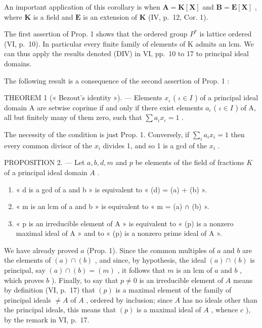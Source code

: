 An important application of this corollary is when \(\mathbf{A} = \mathbf{K}[\mathbf{X}]\) and \(\mathbf{B} = \mathbf{E}[\mathbf{X}]\) , where \(\mathbf{K}\) is a field and \(\mathbf{E}\) is an extension of \(\mathbf{K}\) (IV, p.~12, Cor. 1).

The first assertion of Prop. 1 shows that the ordered group \(P^{*}\) is lattice ordered (VI, p.~10). In particular every finite family of elements of K admits an lcm. We can thus apply the results denoted (DIV) in VI, pp.~10 to 17 to principal ideal domains.

The following result is a consequence of the second assertion of Prop. 1 :

THEOREM 1 (« Bezout's identity »). --- Elements \(x_{\iota}\) ( \(\iota \in I\) ) of a principal ideal domain A are setwise coprime if and only if there exist elements \(a_{\iota}\) ( \(\iota \in I\) ) of A, all but finitely many of them zero, such that \(\sum a_{\iota}x_{\iota} = 1\) .

The necessity of the condition is just Prop. 1. Conversely, if \(\sum_{i} a_i x_i = 1\) then every common divisor of the \(x_i\) divides 1, and so 1 is a gcd of the \(x_i\) .

PROPOSITION 2. --- Let \(a, b, d, m\) and \(p\) be elements of the field of fractions \(K\) of a principal ideal domain \(A\) .

\begin{enumerate}
\def\labelenumi{\alph{enumi})}
\item
  « d is a gcd of a and b » is equivalent to « (d) = (a) + (b) ».
\item
  « m is an lcm of a and b » is equivalent to « m = (a) ∩ (b) ».
\item
  « p is an irreducible element of A » is equivalent to « (p) is a nonzero maximal ideal of A » and to « (p) is a nonzero prime ideal of A ».
\end{enumerate}

We have already proved \(a\) (Prop. 1). Since the common multiples of \(a\) and \(b\) are the elements of \((a) \cap (b)\) , and since, by hypothesis, the ideal \((a) \cap (b)\) is principal, say \((a) \cap (b) = (m)\) , it follows that \(m\) is an lcm of \(a\) and \(b\) , which proves \(b\) ). Finally, to say that \(p \neq 0\) is an irreducible element of \(A\) means by definition (VI, p.~17) that \((p)\) is a maximal element of the family of principal ideals \(\neq A\) of \(A\) , ordered by inclusion; since \(A\) has no ideals other than the principal ideals, this means that \((p)\) is a maximal ideal of \(A\) , whence \(c\) ), by the remark in VI, p.~17.

